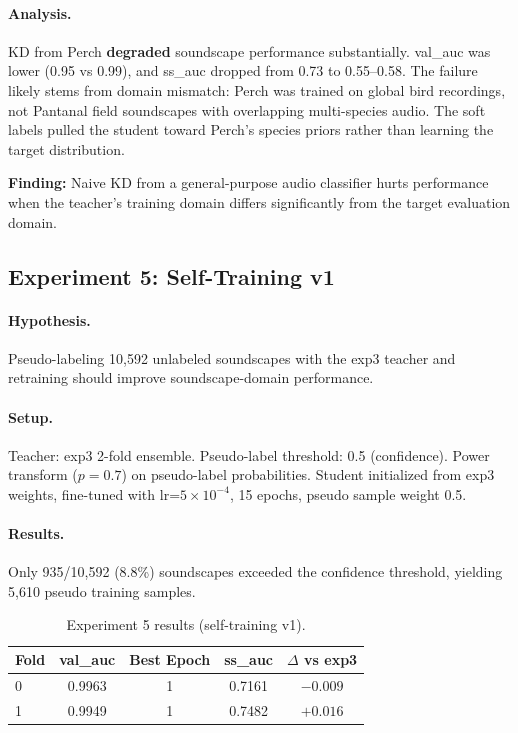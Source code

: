 \paragraph{Analysis.}
KD from Perch \textbf{degraded} soundscape performance substantially.
val\_auc was lower (0.95 vs 0.99), and ss\_auc dropped from 0.73 to 0.55--0.58.
The failure likely stems from domain mismatch: Perch was trained on global bird
recordings, not Pantanal field soundscapes with overlapping multi-species audio.
The soft labels pulled the student toward Perch's species priors rather than
learning the target distribution.

\textbf{Finding:} Naive KD from a general-purpose audio classifier hurts
performance when the teacher's training domain differs significantly from
the target evaluation domain.

\subsection{Experiment 5: Self-Training v1}
\label{sec:exp5}

\paragraph{Hypothesis.}
Pseudo-labeling 10,592 unlabeled soundscapes with the exp3 teacher and
retraining should improve soundscape-domain performance.

\paragraph{Setup.}
Teacher: exp3 2-fold ensemble. Pseudo-label threshold: 0.5 (confidence).
Power transform ($p=0.7$) on pseudo-label probabilities.
Student initialized from exp3 weights, fine-tuned with
lr=$5 \times 10^{-4}$, 15 epochs, pseudo sample weight 0.5.

\paragraph{Results.}
Only 935/10,592 (8.8\%) soundscapes exceeded the confidence threshold,
yielding 5,610 pseudo training samples.

\begin{table}[h]
\centering
\caption{Experiment 5 results (self-training v1).}
\label{tab:exp5}
\begin{tabular}{lcccc}
\hline
\textbf{Fold} & \textbf{val\_auc} & \textbf{Best Epoch} & \textbf{ss\_auc} & \textbf{$\Delta$ vs exp3} \\
\hline
0 & 0.9963 & 1 & 0.7161 & $-0.009$ \\
1 & 0.9949 & 1 & 0.7482 & $+0.016$ \\
\hline
\end{tabular}
\end{table}

